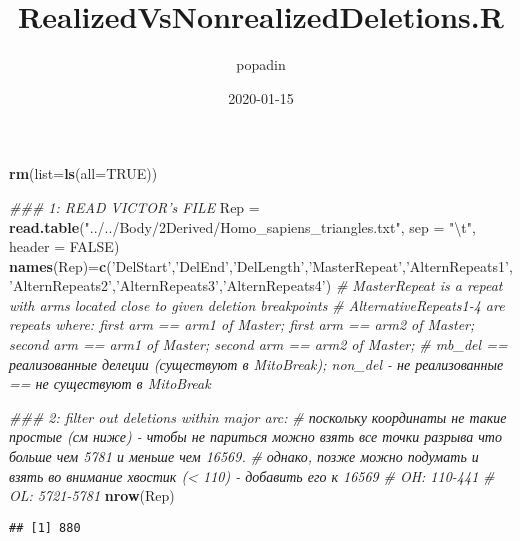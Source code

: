 \documentclass[]{article}
\title{RealizedVsNonrealizedDeletions.R}
\author{popadin}
\date{2020-01-15}
\newenvironment{Shaded}{\begin{snugshade}}{\end{snugshade}}
\newcommand{\CharTok}[1]{\textcolor[rgb]{0.31,0.60,0.02}{#1}}
\newcommand{\CommentTok}[1]{\textcolor[rgb]{0.56,0.35,0.01}{\textit{#1}}}
\newcommand{\DataTypeTok}[1]{\textcolor[rgb]{0.13,0.29,0.53}{#1}}
\newcommand{\DecValTok}[1]{\textcolor[rgb]{0.00,0.00,0.81}{#1}}
\newcommand{\KeywordTok}[1]{\textcolor[rgb]{0.13,0.29,0.53}{\textbf{#1}}}
\newcommand{\NormalTok}[1]{#1}
\newcommand{\OperatorTok}[1]{\textcolor[rgb]{0.81,0.36,0.00}{\textbf{#1}}}
\newcommand{\OtherTok}[1]{\textcolor[rgb]{0.56,0.35,0.01}{#1}}
\newcommand{\StringTok}[1]{\textcolor[rgb]{0.31,0.60,0.02}{#1}}
\begin{document}
\maketitle

\begin{Shaded}
\begin{Highlighting}[]
\KeywordTok{rm}\NormalTok{(}\DataTypeTok{list=}\KeywordTok{ls}\NormalTok{(}\DataTypeTok{all=}\OtherTok{TRUE}\NormalTok{))}
  
\CommentTok{### 1: READ VICTOR's FILE }
\NormalTok{Rep =}\StringTok{ }\KeywordTok{read.table}\NormalTok{(}\StringTok{"../../Body/2Derived/Homo_sapiens_triangles.txt"}\NormalTok{, }\DataTypeTok{sep =} \StringTok{"}\CharTok{\textbackslash{}t}\StringTok{"}\NormalTok{, }\DataTypeTok{header =} \OtherTok{FALSE}\NormalTok{)}
\KeywordTok{names}\NormalTok{(Rep)=}\KeywordTok{c}\NormalTok{(}\StringTok{'DelStart'}\NormalTok{,}\StringTok{'DelEnd'}\NormalTok{,}\StringTok{'DelLength'}\NormalTok{,}\StringTok{'MasterRepeat'}\NormalTok{,}\StringTok{'AlternRepeats1'}\NormalTok{,}\StringTok{'AlternRepeats2'}\NormalTok{,}\StringTok{'AlternRepeats3'}\NormalTok{,}\StringTok{'AlternRepeats4'}\NormalTok{)}
\CommentTok{# MasterRepeat is a repeat with arms located close to given deletion breakpoints}
\CommentTok{# AlternativeRepeats1-4 are repeats where: first arm == arm1 of Master; first arm == arm2 of Master; second arm == arm1 of Master; second arm == arm2 of Master; }
\CommentTok{# mb_del == реализованные делеции (существуют в MitoBreak); non_del - не реализованные == не существуют в MitoBreak}

\CommentTok{### 2: filter out deletions within major arc:}
\CommentTok{# поскольку координаты не такие простые (см ниже) - чтобы не париться можно взять все точки разрыва что больше чем 5781 и меньше чем 16569. }
\CommentTok{# однако, позже можно подумать и взять во внимание хвостик (< 110) - добавить его к 16569}
\CommentTok{# OH: 110-441}
\CommentTok{# OL: 5721-5781}
\KeywordTok{nrow}\NormalTok{(Rep)}
\end{Highlighting}
\end{Shaded}

\begin{verbatim}
## [1] 880
\end{verbatim}

\begin{Shaded}
\end{Shaded}
\end{document}
